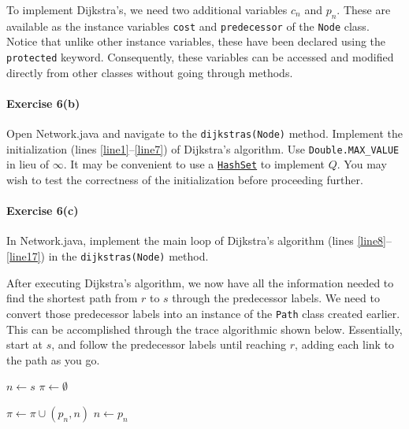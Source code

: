 \documentclass[12pt]{article}
\begin{document}
\noindent
To implement Dijkstra's, we need two additional variables $c_n$ and $p_n$. These are available as the instance variables \texttt{cost} and \texttt{predecessor} of the \texttt{Node} class. Notice that unlike other instance variables, these have been declared using the \texttt{protected} keyword. Consequently, these variables can be accessed and modified directly from other classes without going through methods. 


\paragraph*{Exercise 6(b)} Open Network.java and navigate to the \texttt{dijkstras(Node)} method. Implement the initialization (lines \ref{line1}--\ref{line7}) of Dijkstra's algorithm. Use \texttt{Double.MAX\_VALUE} in lieu of $\infty$. 
It may be convenient to use a \href{https://www.w3schools.com/java/java_hashset.asp}{\texttt{HashSet}} to implement $Q$. You may wish to test the correctness of the initialization before proceeding further. 


\paragraph*{Exercise 6(c)} In Network.java, implement the main loop of Dijkstra's algorithm (lines \ref{line8}--\ref{line17}) in the \texttt{dijkstras(Node)} method. 

\vspace{\baselineskip}

\noindent
After executing Dijkstra's algorithm, we now have all the information needed to find the shortest path from $r$ to $s$ through the predecessor labels. We need to convert those predecessor labels into an instance of the \texttt{Path} class created earlier. This can be accomplished through the trace algorithmic shown below. Essentially, start at $s$, and follow the predecessor labels until reaching $r$, adding each link to the path as you go. 

\vspace{\baselineskip}

\begin{algorithmic}[1]
	\State $n\leftarrow s$
	\State $\pi \leftarrow \emptyset$
	
	\vspace{0.5\baselineskip}
	
	\State $\pi\leftarrow \pi \cup (p_n,n)$
	\State $n\leftarrow p_n$
	\EndWhile
	\EndProcedure
\end{algorithmic}
\end{document}
